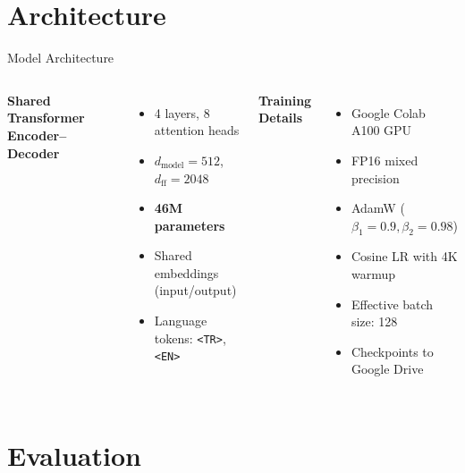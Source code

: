\documentclass[aspectratio=169]{beamer}
\begin{document}
\section{Architecture}

\begin{frame}{Model Architecture}
  \begin{columns}
    \textbf{Shared Transformer Encoder--Decoder}
    \begin{itemize}
      \item 4 layers, 8 attention heads
      \item $d_{\text{model}} = 512$, $d_{\text{ff}} = 2048$
      \item \textbf{46M parameters}
      \item Shared embeddings (input/output)
      \item Language tokens: \texttt{<TR>}, \texttt{<EN>}
    \end{itemize}
    \textbf{Training Details}
    \begin{itemize}
      \item Google Colab A100 GPU
      \item FP16 mixed precision
      \item AdamW ($\beta_1\!=\!0.9, \beta_2\!=\!0.98$)
      \item Cosine LR with 4K warmup
      \item Effective batch size: 128
      \item Checkpoints to Google Drive
    \end{itemize}
  \end{columns}
\end{frame}

\section{Evaluation}
\end{document}
